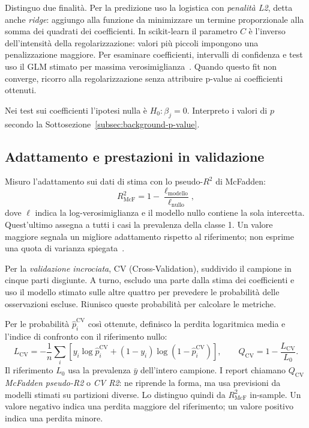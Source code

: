 Distinguo due finalità. Per la predizione uso la logistica con \emph{penalità L2}, detta anche \emph{ridge}: aggiungo alla funzione da minimizzare un termine proporzionale alla somma dei quadrati dei coefficienti. In scikit-learn il parametro $C$ è l'inverso dell'intensità della regolarizzazione: valori più piccoli impongono una penalizzazione maggiore. Per esaminare coefficienti, intervalli di confidenza e test uso il GLM stimato per massima verosimiglianza~\cite{68aee965-a8a0-3e72-9f89-8d89ae91a62b}. Quando questo fit non converge, ricorro alla regolarizzazione senza attribuire p-value ai coefficienti ottenuti.

Nei test sui coefficienti l'ipotesi nulla è $H_0:\beta_j=0$. Interpreto i valori di $p$~\cite{10.1007/11744078_23} secondo la Sottosezione~\ref{subsec:background-p-value}.

\subsection{Adattamento e prestazioni in validazione}
\label{subsec:materiali-metriche-classificazione}

Misuro l'adattamento sui dati di stima con lo pseudo-$R^2$ di McFadden:
\begin{equation}
    R^2_{\mathrm{McF}}=1-\frac{\ell_{\mathrm{modello}}}{\ell_{\mathrm{nullo}}},
    \label{eq:materiali-mcfadden}
\end{equation}
dove $\ell$ indica la log-verosimiglianza e il modello nullo contiene la sola intercetta. Quest'ultimo assegna a tutti i casi la prevalenza della classe 1. Un valore maggiore segnala un migliore adattamento rispetto al riferimento; non esprime una quota di varianza spiegata~\cite{mcfadden1972conditional}.

Per la \emph{validazione incrociata}, CV (Cross-Validation), suddivido il campione in cinque parti disgiunte. A turno, escludo una parte dalla stima dei coefficienti e uso il modello stimato sulle altre quattro per prevedere le probabilità delle osservazioni escluse. Riunisco queste probabilità per calcolare le metriche.

Per le probabilità $\widehat p_i^{\mathrm{CV}}$ così ottenute, definisco la perdita logaritmica media e l'indice di confronto con il riferimento nullo:
\begin{equation}
    L_{\mathrm{CV}}=-\frac{1}{n}\sum_i
    \left[y_i\log\widehat p_i^{\mathrm{CV}}+
    (1-y_i)\log(1-\widehat p_i^{\mathrm{CV}})\right],
    \qquad Q_{\mathrm{CV}}=1-\frac{L_{\mathrm{CV}}}{L_0}.
    \label{eq:classificazione-cv}
\end{equation}
Il riferimento $L_0$ usa la prevalenza $\bar y$ dell'intero campione. I report chiamano $Q_{\mathrm{CV}}$ \emph{McFadden pseudo-R2} o \emph{CV R2}: ne riprende la forma, ma usa previsioni da modelli stimati su partizioni diverse. Lo distinguo quindi da $R^2_{\mathrm{McF}}$ in-sample. Un valore negativo indica una perdita maggiore del riferimento; un valore positivo indica una perdita minore.

